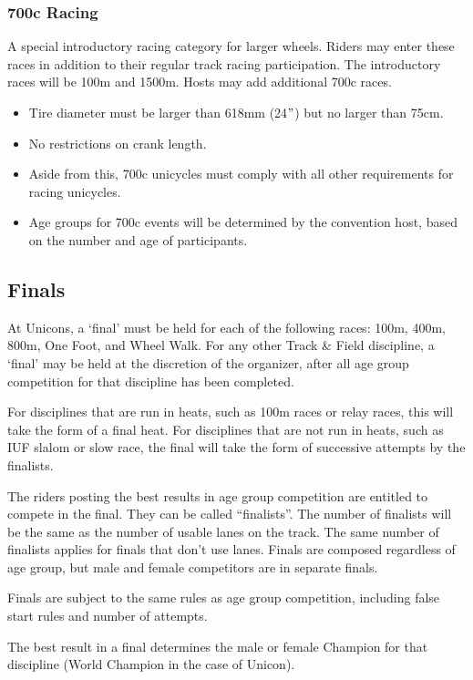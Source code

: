 \subsubsection{700c Racing}
A special introductory racing category for larger wheels.
Riders may enter these races in addition to their regular track racing participation.
The introductory races will be 100m and 1500m.
Hosts may add additional 700c races.
\begin{itemize}
\item Tire diameter must be larger than 618mm (24$"$) but no larger than 75cm.
\item No restrictions on crank length.
\item Aside from this, 700c unicycles must comply with all other requirements for racing unicycles.
\item Age groups for 700c events will be determined by the convention host, based on the number and age of participants.
\end{itemize}

\subsection{Finals}
At Unicons, a `final' must be held for each of the following races: 100m, 400m, 800m, One Foot, and Wheel Walk. 
For any other Track \& Field discipline, a `final' may be held at the discretion of the organizer, after all age group competition for that discipline has been completed.

For disciplines that are run in heats, such as 100m races or relay races, this will take the form of a final heat. 
For disciplines that are not run in heats, such as IUF slalom or slow race, the final will take the form of successive attempts by the finalists.

The riders posting the best results in age group competition are entitled to compete in the final.
They can be called ``finalists''.
The number of finalists will be the same as the number of usable lanes on the track.
The same number of finalists applies for finals that don’t use lanes. 
Finals are composed regardless of age group, but male and female competitors are in separate finals.

Finals are subject to the same rules as age group competition, including false start rules and number of attempts.

The best result in a final determines the male or female Champion for that discipline (World Champion in the case of Unicon).

